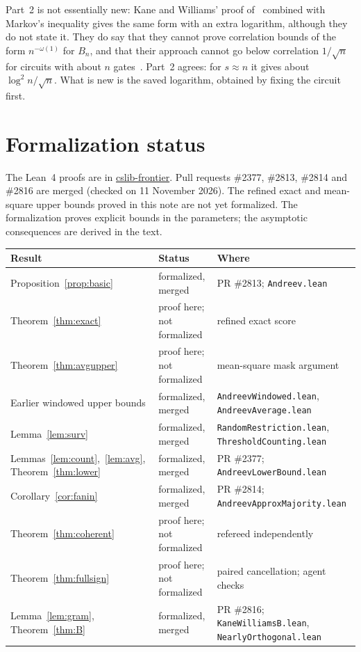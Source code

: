 \documentclass[11pt,letterpaper]{article}
\theoremstyle{remark}
\newcommand{\sect}[1]{\section{\texorpdfstring{\color{ink}#1}{#1}}}
\begin{document}
Part~2 is not essentially new: Kane and Williams' proof
of~\cite[Cor.~6.2]{KW} combined with Markov's inequality gives the same form
with an extra logarithm, although they do not state it. They do say that they
cannot prove correlation bounds of the form $n^{-\omega(1)}$ for $B_n$, and
that their approach cannot go below correlation $1/\sqrt n$ for circuits with
about $n$ gates~\cite[Section~6]{KW}. Part~2 agrees: for $s\approx n$ it
gives about $\log^2n/\sqrt n$. What is new is the saved logarithm, obtained
by fixing the circuit first.

\sect{Formalization status}\label{sec:lean}

The Lean~4 proofs are in \href{https://github.com/cslib-community/cslib-frontier}{cslib-frontier}. Pull requests
\#2377, \#2813, \#2814 and \#2816 are merged (checked on 11 November 2026). The refined exact and mean-square upper bounds proved in
this note are not yet formalized. The formalization proves explicit bounds in the
parameters; the asymptotic consequences are derived in the text.

\begin{center}
\small
\renewcommand{\arraystretch}{1.2}
\begin{tabular}{@{}P{0.30\textwidth}P{0.23\textwidth}P{0.40\textwidth}@{}}
\toprule
Result & Status & Where\\
\midrule
Proposition~\ref{prop:basic} & formalized, merged & PR \#2813; \texttt{Andreev.lean}\\
Theorem~\ref{thm:exact} & proof here; not formalized & refined exact score\\
Theorem~\ref{thm:avgupper} & proof here; not formalized & mean-square mask argument\\
Earlier windowed upper bounds & formalized, merged & \texttt{AndreevWindowed.lean}, \texttt{AndreevAverage.lean}\\
Lemma~\ref{lem:surv} & formalized, merged & \texttt{RandomRestriction.lean}, \texttt{ThresholdCounting.lean}\\
Lemmas~\ref{lem:count},~\ref{lem:avg}, Theorem~\ref{thm:lower} & formalized, merged & PR \#2377; \texttt{AndreevLowerBound.lean}\\
Corollary~\ref{cor:fanin} & formalized, merged & PR \#2814; \texttt{AndreevApproxMajority.lean}\\
Theorem~\ref{thm:coherent} & proof here; not formalized & refereed independently\\
Theorem~\ref{thm:fullsign} & proof here; not formalized & paired cancellation; agent checks\\
Lemma~\ref{lem:gram}, Theorem~\ref{thm:B} & formalized, merged & PR \#2816; \texttt{KaneWilliamsB.lean}, \texttt{NearlyOrthogonal.lean}\\
\bottomrule
\end{tabular}
\end{center}
\end{document}
